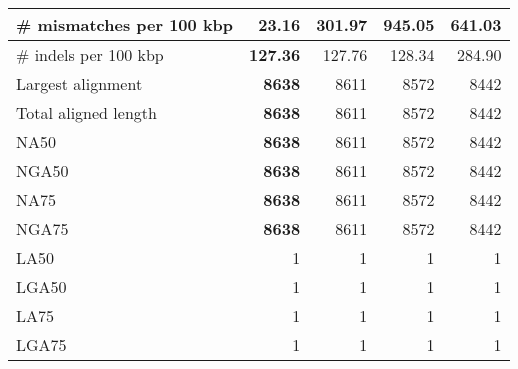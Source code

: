 \documentclass[12pt,a4paper]{article}
\begin{document}
\begin{table}[ht]
\begin{center}
\begin{tabular}{|l*{4}{|r}|}
\# mismatches per 100 kbp & {\bf 23.16} & 301.97 & 945.05 & 641.03 \\ \hline
\# indels per 100 kbp & {\bf 127.36} & 127.76 & 128.34 & 284.90 \\ \hline
Largest alignment & {\bf 8638} & 8611 & 8572 & 8442 \\ \hline
Total aligned length & {\bf 8638} & 8611 & 8572 & 8442 \\ \hline
NA50 & {\bf 8638} & 8611 & 8572 & 8442 \\ \hline
NGA50 & {\bf 8638} & 8611 & 8572 & 8442 \\ \hline
NA75 & {\bf 8638} & 8611 & 8572 & 8442 \\ \hline
NGA75 & {\bf 8638} & 8611 & 8572 & 8442 \\ \hline
LA50 & 1 & 1 & 1 & 1 \\ \hline
LGA50 & 1 & 1 & 1 & 1 \\ \hline
LA75 & 1 & 1 & 1 & 1 \\ \hline
LGA75 & 1 & 1 & 1 & 1 \\ \hline
\end{tabular}
\end{center}
\end{table}
\end{document}
